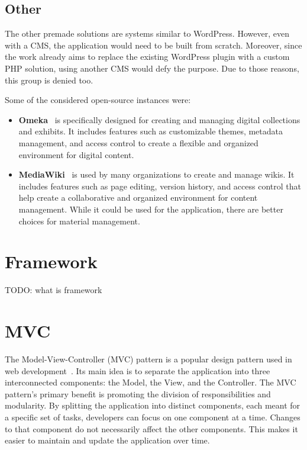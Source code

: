 \documentclass[
  digital,     %
  oneside,     %
  nosansbold,  %
  colorbold, %
  lof,         %
  lot,         %
]{fithesis4}
\begin{document}
\subsection{Other}

The other premade solutions are systems similar to WordPress. However, even with a CMS, the application would need to be built from scratch. Moreover, since the work already aims to replace the existing WordPress plugin with a custom PHP solution, using another CMS would defy the purpose. Due to those reasons, this group is denied too.

Some of the considered open-source instances were:
\begin{itemize}

	\item \textbf{Omeka}~\cite{https://omeka.org/} is specifically designed for creating and managing digital collections and exhibits. It includes features such as customizable themes, metadata management, and access control to create a flexible and organized environment for digital content.
	
	\item \textbf{MediaWiki}~\cite{https://www.mediawiki.org/wiki/MediaWiki} is used by many organizations to create and manage wikis. It includes features such as page editing, version history, and access control that help create a collaborative and organized environment for content management. While it could be used for the application, there are better choices for material management.

\end{itemize}

\section{Framework}

TODO: what is framework

\section{MVC}

The Model-View-Controller (MVC) pattern is a popular design pattern used in web development~\cite{MVC}. Its main idea is to separate the application into three interconnected components: the Model, the View, and the Controller. The MVC pattern's primary benefit is promoting the division of responsibilities and modularity. By splitting the application into distinct components, each meant for a specific set of tasks, developers can focus on one component at a time. Changes to that component do not necessarily affect the other components. This makes it easier to maintain and update the application over time.
\end{document}
